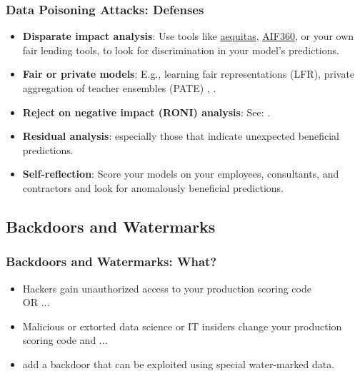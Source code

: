\documentclass[11pt,
               aspectratio=169,
               hyperref={colorlinks}
               ]{beamer}
\begin{document}
			\begin{frame}[label={slide:data_poisoning_defense}]
		
				\frametitle{Data Poisoning Attacks: \textbf{Defenses}}
				
				\begin{itemize}
					\item \textbf{Disparate impact analysis}: Use tools like \href{https://github.com/dssg/aequitas}{aequitas}, \href{https://github.com/IBM/AIF360}{AIF360}, or your own fair lending tools, to look for discrimination in your model’s predictions. 
					\item \textbf{Fair or private models}: E.g., learning fair representations (LFR), private aggregation of teacher ensembles (PATE) \cite{pate}, \cite{lfr}.
					\item \textbf{Reject on negative impact (RONI) analysis}: See: \textit{} \cite{security_of_ml}. 		
					\item \textbf{Residual analysis}: especially those that indicate unexpected beneficial predictions.
					\item \textbf{Self-reflection}: Score your models on your employees, consultants, and contractors and look for anomalously beneficial predictions.
				\end{itemize}	
			\end{frame}
		
		\subsection{Backdoors and Watermarks}
			
			\begin{frame}
		
				\frametitle{Backdoors and Watermarks: \textbf{What?}}
				\begin{itemize}
				\Large
				\item Hackers gain unauthorized access to your production scoring code \\ OR ...
				\item Malicious or extorted data science or IT insiders change your production scoring code and ...
				\item add a backdoor that can be exploited using special water-marked data.
				\end{itemize}	
			\end{frame}
		
\end{document}
